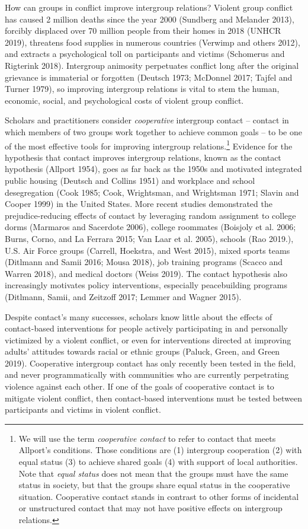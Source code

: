 \documentclass[11pt]{article}
\begin{document}
How can groups in conflict improve intergroup relations? Violent group
conflict has caused 2 million deaths since the year 2000 (Sundberg and
Melander 2013), forcibly displaced over 70 million people from their
homes in 2018 (UNHCR 2019), threatens food supplies in numerous
countries (Verwimp and others 2012), and extracts a psychological toll
on participants and victims (Schomerus and Rigterink 2018). Intergroup
animosity perpetuates conflict long after the original grievance is
immaterial or forgotten (Deutsch 1973; McDonnel 2017; Tajfel and Turner
1979), so improving intergroup relations is vital to stem the human,
economic, social, and psychological costs of violent group conflict.

Scholars and practitioners consider \emph{cooperative} intergroup
contact -- contact in which members of two groups work together to
achieve common goals -- to be one of the most effective tools for
improving intergroup relations.\footnote{We will use the term
  \emph{cooperative contact} to refer to contact that meets Allport's
  conditions. Those conditions are (1) intergroup cooperation (2) with
  equal status (3) to achieve shared goals (4) with support of local
  authorities. Note that \emph{equal status} does not mean that the
  groups must have the same status in society, but that the groups share
  equal status in the cooperative situation. Cooperative contact stands
  in contrast to other forms of incidental or unstructured contact that
  may not have positive effects on intergroup relations.} Evidence for
the hypothesis that contact improves intergroup relations, known as the
contact hypothesis (Allport 1954), goes as far back as the 1950s and
motivated integrated public housing (Deutsch and Collins 1951) and
workplace and school desegregation (Cook 1985; Cook, Wrightsman, and
Wrightsman 1971; Slavin and Cooper 1999) in the United States. More
recent studies demonstrated the prejudice-reducing effects of contact by
leveraging random assignment to college dorms (Marmaros and Sacerdote
2006), college roommates (Boisjoly et al. 2006; Burns, Corno, and La
Ferrara 2015; Van Laar et al. 2005), schools (Rao 2019.), U.S. Air Force
groups (Carrell, Hoekstra, and West 2015), mixed sports teams (Ditlmann
and Samii 2016; Mousa 2018), job training programs (Scacco and Warren
2018), and medical doctors (Weiss 2019). The contact hypothesis also
increasingly motivates policy interventions, especially peacebuilding
programs (Ditlmann, Samii, and Zeitzoff 2017; Lemmer and Wagner 2015).

Despite contact's many successes, scholars know little about the effects
of contact-based interventions for people actively participating in and
personally victimized by a violent conflict, or even for interventions
directed at improving adults' attitudes towards racial or ethnic groups
(Paluck, Green, and Green 2019). Cooperative intergroup contact has only
recently been tested in the field, and never programmatically with
communities who are currently perpetrating violence against each other.
If one of the goals of cooperative contact is to mitigate violent
conflict, then contact-based interventions must be tested between
participants and victims in violent conflict.
\end{document}
